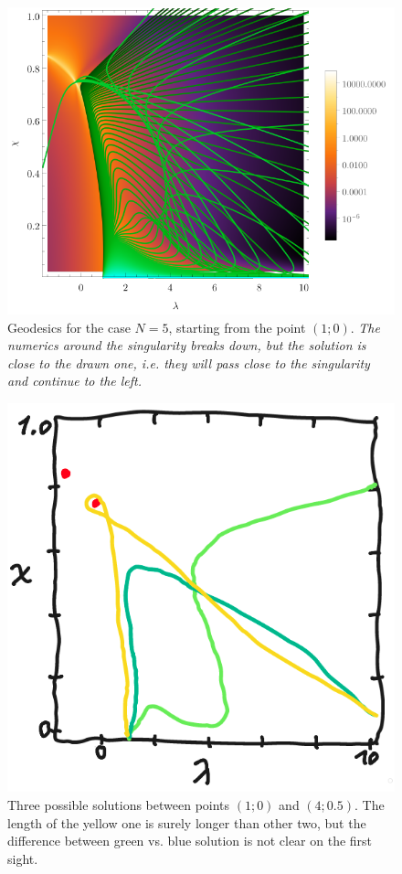 \begin{figure}[H]
    \centering
    \includegraphics[scale=1.3]{../img/N=5_geods00.pdf}
    \caption{Geodesics for the case $N=5$, starting from the point $(1;0)$. \emph{The numerics around the singularity breaks down, but the solution is close to the drawn one, i.e. they will pass close to the singularity and continue to the left.}}
    \label{fig:geod10}    
\end{figure}

\begin{figure}[H]
    \centering
    \includegraphics[scale=0.35]{../img/geodesicSolutionsDrawing.png}
    \caption{Three possible solutions between points $(1;0)$ and $(4;0.5)$. The length of the yellow one is surely longer than other two, but the difference between green vs. blue solution is not clear on the first sight.}
    \label{fig:geodesicsBetweenPoints}    
\end{figure}






